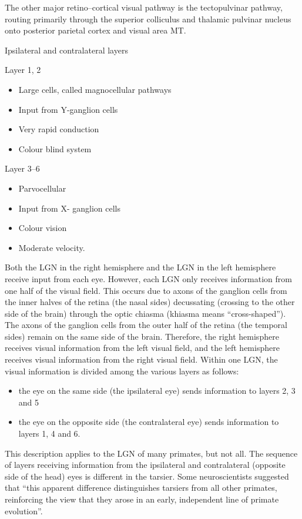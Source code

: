 The other major retino--cortical visual pathway is the tectopulvinar pathway, routing primarily through the superior colliculus and thalamic pulvinar nucleus onto posterior parietal cortex and visual area MT.

Ipsilateral and contralateral layers

Layer 1, 2

\begin{itemize}
\tightlist
\item
  Large cells, called magnocellular pathways
\item
  Input from Y-ganglion cells
\item
  Very rapid conduction
\item
  Colour blind system
\end{itemize}

Layer 3--6

\begin{itemize}
\tightlist
\item
  Parvocellular
\item
  Input from X- ganglion cells
\item
  Colour vision
\item
  Moderate velocity.
\end{itemize}

Both the LGN in the right hemisphere and the LGN in the left hemisphere receive input from each eye. However, each LGN only receives information from one half of the visual field. This occurs due to axons of the ganglion cells from the inner halves of the retina (the nasal sides) decussating (crossing to the other side of the brain) through the optic chiasma (khiasma means ``cross-shaped''). The axons of the ganglion cells from the outer half of the retina (the temporal sides) remain on the same side of the brain. Therefore, the right hemisphere receives visual information from the left visual field, and the left hemisphere receives visual information from the right visual field. Within one LGN, the visual information is divided among the various layers as follows:

\begin{itemize}
\tightlist
\item
  the eye on the same side (the ipsilateral eye) sends information to layers 2, 3 and 5
\item
  the eye on the opposite side (the contralateral eye) sends information to layers 1, 4 and 6.
\end{itemize}

This description applies to the LGN of many primates, but not all. The sequence of layers receiving information from the ipsilateral and contralateral (opposite side of the head) eyes is different in the tarsier. Some neuroscientists suggested that ``this apparent difference distinguishes tarsiers from all other primates, reinforcing the view that they arose in an early, independent line of primate evolution''.

